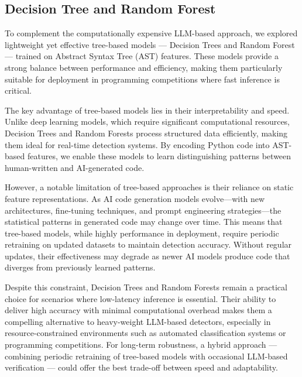 \documentclass{article}
\begin{document}
\subsection{Decision Tree and Random Forest}
To complement the computationally expensive LLM-based approach, we explored lightweight yet effective tree-based models --- Decision Trees and Random Forest --- trained on Abstract Syntax Tree (AST) features. These models provide a strong balance between performance and efficiency, making them particularly suitable for deployment in programming competitions where fast inference is critical.

The key advantage of tree-based models lies in their interpretability and speed. Unlike deep learning models, which require significant computational resources, Decision Trees and Random Forests process structured data efficiently, making them ideal for real-time detection systems. By encoding Python code into AST-based features, we enable these models to learn distinguishing patterns between human-written and AI-generated code.

However, a notable limitation of tree-based approaches is their reliance on static feature representations. As AI code generation models evolve—with new architectures, fine-tuning techniques, and prompt engineering strategies—the statistical patterns in generated code may change over time. This means that tree-based models, while highly performance in deployment, require periodic retraining on updated datasets to maintain detection accuracy. Without regular updates, their effectiveness may degrade as newer AI models produce code that diverges from previously learned patterns.

Despite this constraint, Decision Trees and Random Forests remain a practical choice for scenarios where low-latency inference is essential. Their ability to deliver high accuracy with minimal computational overhead makes them a compelling alternative to heavy-weight LLM-based detectors, especially in resource-constrained environments such as automated classification systems or programming competitions. For long-term robustness, a hybrid approach --- combining periodic retraining of tree-based models with occasional LLM-based verification --- could offer the best trade-off between speed and adaptability.
\end{document}

